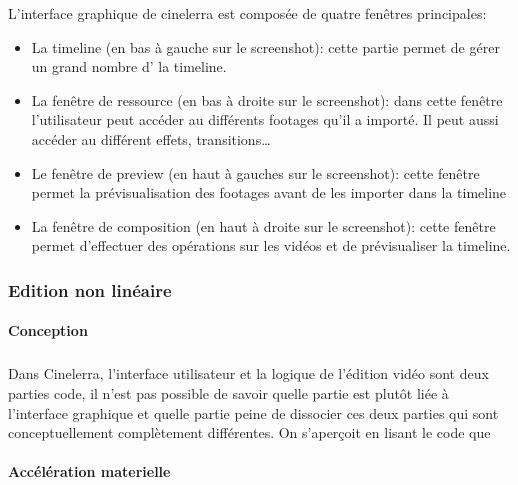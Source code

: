 L'interface graphique de cinelerra est composée de quatre fenêtres
principales:

\begin{itemize}
  \item {La timeline (en bas à gauche sur le screenshot): cette
    partie permet de gérer un grand nombre d'%
    la timeline.}

  \item {La fenêtre de ressource (en bas à droite sur le screenshot):
    dans cette fenêtre l'utilisateur peut accéder au différents
    footages qu'il a importé. Il peut aussi accéder au différent effets,
    transitions\ldots}

  \item {Le fenêtre de preview (en haut à gauches sur le screenshot):
    cette fenêtre permet la prévisualisation des footages avant de les
    importer dans la timeline}

  \item {La fenêtre de composition (en haut à droite sur le screenshot):
    cette fenêtre permet d'effectuer des opérations sur les vidéos et
    de prévisualiser la timeline.}

\end{itemize}

\subsubsection{Edition non linéaire}

\paragraph{Conception}

\subparagraph{}

Dans Cinelerra, l'interface utilisateur et la logique de l'édition
vidéo sont deux parties %
code, il n'est pas possible de savoir quelle partie est plutôt liée à
l'interface graphique et quelle partie %
peine de dissocier ces deux parties qui sont conceptuellement complètement
différentes. On s'aperçoit en lisant le code que%

\paragraph{Accélération materielle}

